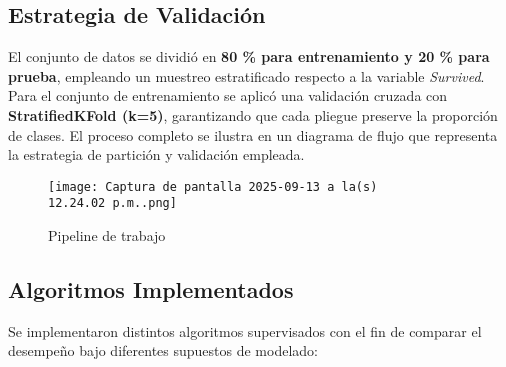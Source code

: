 \documentclass[sjournal]{IEEEtran}
\begin{document}
\subsection*{Estrategia de Validación}

El conjunto de datos se dividió en \textbf{80 \% para entrenamiento y 20 \% para prueba}, empleando un muestreo estratificado respecto a la variable \textit{Survived}. Para el conjunto de entrenamiento se aplicó una validación cruzada con \textbf{StratifiedKFold (k=5)}, garantizando que cada pliegue preserve la proporción de clases. El proceso completo se ilustra en un diagrama de flujo que representa la estrategia de partición y validación empleada.

\begin{figure}[H]
    \centering
    \texttt{[image: Captura de pantalla 2025-09-13 a la(s) 12.24.02 p.m..png]}
    \caption{Pipeline de trabajo}
    \label{fig:placeholder}
\end{figure}
\subsection*{Algoritmos Implementados}
Se implementaron distintos algoritmos supervisados con el fin de comparar el desempeño bajo diferentes supuestos de modelado:
\end{document}
